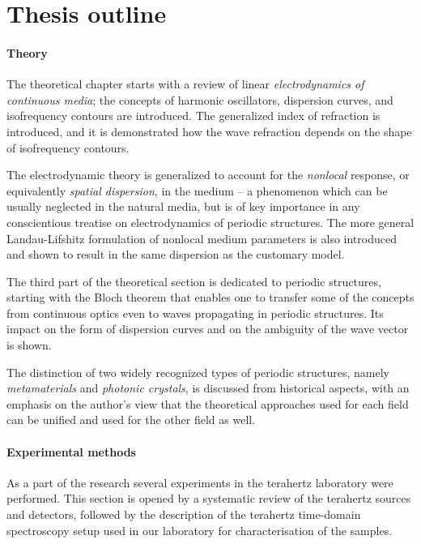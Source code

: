 \section{Thesis outline}
\paragraph{Theory} %
The theoretical chapter starts with a review of linear \textit{electrodynamics of continuous media}; the concepts of harmonic oscillators, dispersion curves, and isofrequency contours are introduced. The generalized index of refraction is introduced, and it is demonstrated how the wave refraction depends on the shape of isofrequency contours.

The electrodynamic theory is generalized to account for the \textit{nonlocal} response, or equivalently \textit{spatial dispersion}, in the medium -- a phenomenon which can be usually neglected in the natural media, but is of key importance in any conscientious treatise on electrodynamics of periodic structures.
The more general Landau-Lifshitz formulation of nonlocal medium parameters is also introduced and shown to result in the same dispersion as the customary model.  

The third part of the theoretical section is dedicated to periodic structures, starting with the Bloch theorem that enables one to transfer some of the concepts from continuous optics even to waves propagating in periodic structures. Its impact on the form of dispersion curves and on the ambiguity of the wave vector is shown.

The distinction of two widely recognized types of periodic structures, namely \textit{metamaterials} and \textit{photonic crystals}, is discussed from historical
aspects, with an emphasis on the author's view that the theoretical approaches used for each field can be unified and used for the other field as well.

\paragraph{Experimental methods} %
As a part of the research several experiments in the terahertz laboratory were performed. This section is opened by a systematic review of the terahertz sources and detectors, followed by the description of the terahertz time-domain spectroscopy setup used in our laboratory for characterisation of the samples. 

